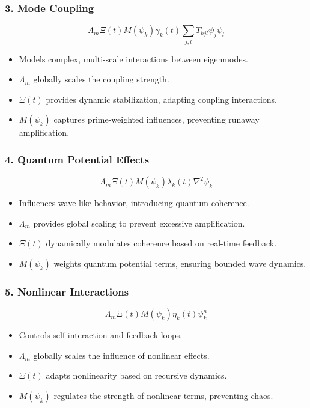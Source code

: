\documentclass[12pt]{article}
\theoremstyle{plain}
\begin{document}
\subsubsection{3. Mode Coupling}

\[
\Lambda_m \Xi(t) M(\psi_k) \gamma_k(t) \sum_{j,l} T_{kjl} \psi_j \psi_l
\]

\begin{itemize}
    \item Models complex, multi-scale interactions between eigenmodes.
    \item \(\Lambda_m\) globally scales the coupling strength.
    \item \(\Xi(t)\) provides dynamic stabilization, adapting coupling interactions.
    \item \(M(\psi_k)\) captures prime-weighted influences, preventing runaway amplification.
\end{itemize}

\subsubsection{4. Quantum Potential Effects}

\[
\Lambda_m \Xi(t) M(\psi_k) \lambda_k(t) \nabla^2 \psi_k
\]

\begin{itemize}
    \item Influences wave-like behavior, introducing quantum coherence.
    \item \(\Lambda_m\) provides global scaling to prevent excessive amplification.
    \item \(\Xi(t)\) dynamically modulates coherence based on real-time feedback.
    \item \(M(\psi_k)\) weights quantum potential terms, ensuring bounded wave dynamics.
\end{itemize}

\subsubsection{5. Nonlinear Interactions}

\[
\Lambda_m \Xi(t) M(\psi_k) \eta_k(t) \psi_k^n
\]

\begin{itemize}
    \item Controls self-interaction and feedback loops.
    \item \(\Lambda_m\) globally scales the influence of nonlinear effects.
    \item \(\Xi(t)\) adapts nonlinearity based on recursive dynamics.
    \item \(M(\psi_k)\) regulates the strength of nonlinear terms, preventing chaos.
\end{itemize}
\end{document}
